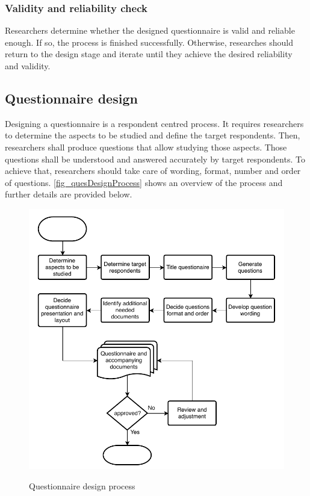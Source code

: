 \subsubsection{Validity and reliability check}
Researchers determine whether the designed questionnaire is valid and reliable enough. If so, the process is finished successfully. Otherwise, researches should return to the design stage and iterate until they achieve the desired reliability and validity.

\subsection{Questionnaire design}
\label{sec:ques_design}
Designing a questionnaire is a respondent centred process. It requires researchers to determine the aspects to be studied and define the target respondents. Then, researchers shall produce questions that allow studying those aspects. Those questions shall be understood and answered accurately by target respondents. To achieve that, researchers should take care of wording, format, number and order of questions. \autoref{fig_quesDesignProcess} shows an overview of the process and further details are provided below.

\begin{figure}[htb]
\myfloatalign
{\includegraphics[width=0.9\linewidth]{gfx/standard/quesDesignProcess}} \quad
\caption[Questionnaire design process]{Questionnaire design process}\label{fig_quesDesignProcess}
\end{figure}

